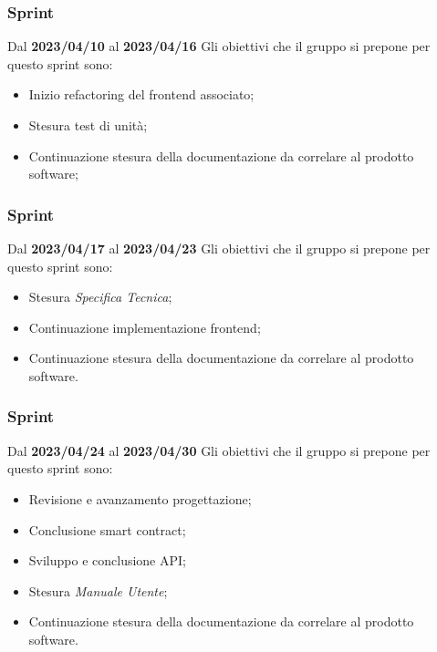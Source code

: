 \subsubsection{ Sprint}
Dal \textbf{2023/04/10} al \textbf{2023/04/16}
\newline
Gli obiettivi che il gruppo si prepone per questo sprint sono:
\begin{itemize}
    \item Inizio refactoring del frontend associato;
    \item Stesura test di unità;
    \item Continuazione stesura della documentazione da correlare al prodotto software;
\end{itemize}
\subsubsection{ Sprint}
Dal \textbf{2023/04/17} al \textbf{2023/04/23}
\newline
Gli obiettivi che il gruppo si prepone per questo sprint sono:
\begin{itemize}
    \item Stesura \textit{Specifica Tecnica};
    \item Continuazione implementazione frontend;
    \item Continuazione stesura della documentazione da correlare al prodotto software.
\end{itemize}
\subsubsection{ Sprint}
Dal \textbf{2023/04/24} al \textbf{2023/04/30}
\newline
Gli obiettivi che il gruppo si prepone per questo sprint sono:
\begin{itemize}
    \item Revisione e avanzamento progettazione;
    \item Conclusione smart contract;
    \item Sviluppo e conclusione API;
    \item Stesura \textit{Manuale Utente};
    \item Continuazione stesura della documentazione da correlare al prodotto software.
\end{itemize}
